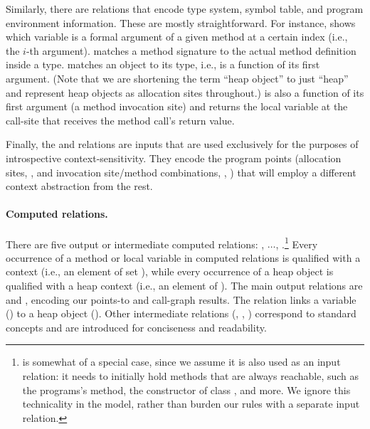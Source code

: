   Similarly, there are relations that encode type system, symbol
  table, and program environment information. These are mostly
  straightforward. For instance,  shows which
  variable is a formal argument of a given method at a certain index
  (i.e., the $i$-th argument).  matches a method
  signature to the actual method definition inside a
  type.  matches an object to its type, i.e., is a
  function of its first argument. (Note that we are shortening the
  term ``heap object'' to just ``heap'' and represent heap objects as
  allocation sites throughout.)  is also a
  function of its first argument (a method invocation site) and
  returns the local variable at the call-site that receives the method
  call's return value. 

  Finally, the  and 
  relations are inputs that are used exclusively for the purposes of
  introspective context-sensitivity. They encode the program points
  (allocation sites, , and invocation site/method
  combinations, , ) that will employ a different
  context abstraction from the rest.
  
\paragraph{Computed relations.}
  There are five output or intermediate computed relations:
  , $\ldots$,
  .\footnote{ is somewhat of a
    special case, since we assume it is also used as an input
    relation: it needs to initially hold methods that are always
    reachable, such as the programs's  method, the
    constructor of class , and more.  We
    ignore this technicality in the model, rather than burden our
    rules with a separate input relation.}  Every occurrence of a
  method or local variable in computed relations is qualified with a
  context (i.e., an element of set ), while every occurrence
  of a heap object is qualified with a heap context (i.e., an element
  of ). The main output relations are 
  and , encoding our points-to and call-graph
  results. The  relation links a variable
  () to a heap object (). Other intermediate
  relations (, ,
  ) correspond to standard concepts and are
  introduced for conciseness and readability.

